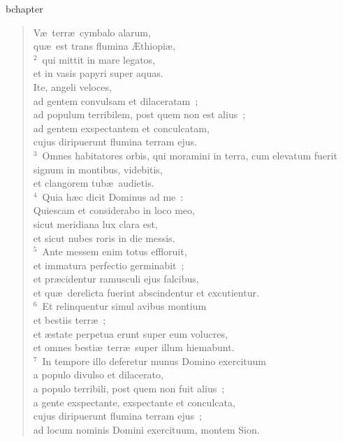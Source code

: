 bchapter\begin{verse}\vspace{-19pt}V\ae\ terr\ae\ cymbalo alarum,\\ qu\ae\ est trans flumina \AE thiopi\ae ,\\
${}^{2}$~qui mittit in mare legatos,\\ et in vasis papyri super aquas.\\ Ite, angeli veloces,\\ ad gentem convulsam et dilaceratam~;\\ ad populum terribilem, post quem non est alius~;\\ ad gentem exspectantem et conculcatam,\\ cujus diripuerunt flumina terram ejus.\\
${}^{3}$~Omnes habitatores orbis, qui moramini in terra, cum elevatum fuerit signum in montibus, videbitis,\\ et clangorem tub\ae\ audietis.\\
${}^{4}$~Quia h\ae c dicit Dominus ad me~:\\ Quiescam et considerabo in loco meo,\\ sicut meridiana lux clara est,\\ et sicut nubes roris in die messis.\\
${}^{5}$~Ante messem enim totus effloruit,\\ et immatura perfectio germinabit~;\\ et pr\ae cidentur ramusculi ejus falcibus,\\ et qu\ae\ derelicta fuerint abscindentur et excutientur.\\
${}^{6}$~Et relinquentur simul avibus montium\\ et bestiis terr\ae~;\\ et \ae state perpetua erunt super eum volucres,\\ et omnes besti\ae\ terr\ae\ super illum hiemabunt.\\
${}^{7}$~In tempore illo deferetur munus Domino exercituum\\ a populo divulso et dilacerato,\\ a populo terribili, post quem non fuit alius~;\\ a gente exspectante, exspectante et conculcata,\\ cujus diripuerunt flumina terram ejus~;\\ ad locum nominis Domini exercituum, montem Sion.\end{verse}



